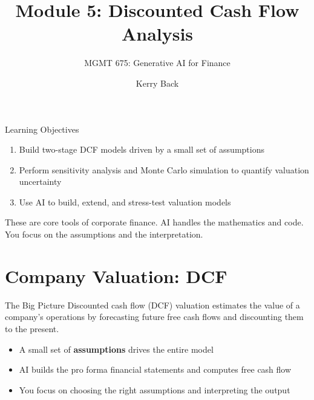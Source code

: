 \documentclass[aspectratio=169]{beamer}
\subtitle{MGMT 675: Generative AI for Finance}
\title{Module 5: Discounted Cash Flow Analysis}
\author{Kerry Back}
\date{}
\begin{document}
\maketitle

\begin{frame}{Learning Objectives}
\begin{enumerate}
  \item Build two-stage DCF models driven by a small set of assumptions
  \item Perform sensitivity analysis and Monte Carlo simulation to quantify valuation uncertainty
  \item Use AI to build, extend, and stress-test valuation models
\end{enumerate}

\vspace{0.5cm}
These are core tools of corporate finance.  AI handles the mathematics and code.  \alert{You focus on the assumptions and the interpretation.}
\end{frame}

\section{Company Valuation: DCF}

\begin{frame}{The Big Picture}
Discounted cash flow (DCF) valuation estimates the value of a company's operations by forecasting future free cash flows and discounting them to the present.

\vspace{0.3cm}
\begin{itemize}
  \item A small set of \textbf{assumptions} drives the entire model
  \item AI builds the pro forma financial statements and computes free cash flow
  \item You focus on \alert{choosing the right assumptions} and \alert{interpreting the output}
\end{itemize}
\end{frame}
\end{document}
